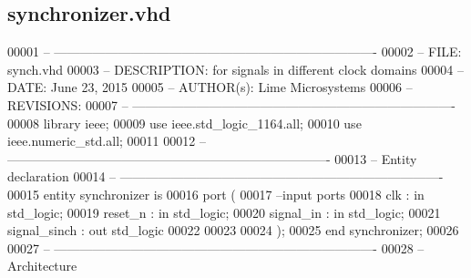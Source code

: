 \subsection{synchronizer.\+vhd}
\label{synchronizer_8vhd_source}

\begin{DoxyCode}
00001 \textcolor{keyword}{-- ---------------------------------------------------------------------------- }
00002 \textcolor{keyword}{-- FILE:    synch.vhd}
00003 \textcolor{keyword}{-- DESCRIPTION: for signals in different clock domains}
00004 \textcolor{keyword}{-- DATE:    June 23, 2015}
00005 \textcolor{keyword}{-- AUTHOR(s):   Lime Microsystems}
00006 \textcolor{keyword}{-- REVISIONS:}
00007 \textcolor{keyword}{-- ---------------------------------------------------------------------------- }
00008 \textcolor{vhdlkeyword}{library }\textcolor{keywordflow}{ieee};
00009 \textcolor{vhdlkeyword}{use }ieee.std\_logic\_1164.\textcolor{keywordflow}{all};
00010 \textcolor{vhdlkeyword}{use }ieee.numeric\_std.\textcolor{keywordflow}{all};
00011 
00012 \textcolor{keyword}{-- ----------------------------------------------------------------------------}
00013 \textcolor{keyword}{-- Entity declaration}
00014 \textcolor{keyword}{-- ----------------------------------------------------------------------------}
00015 \textcolor{keywordflow}{entity }synchronizer \textcolor{keywordflow}{is}
00016   \textcolor{keywordflow}{port} \textcolor{vhdlchar}{(}
00017 \textcolor{keyword}{        --input ports }
00018         \textcolor{vhdlchar}{clk}             \textcolor{vhdlchar}{:} \textcolor{keywordflow}{in} \textcolor{comment}{std\_logic};
00019         \textcolor{vhdlchar}{reset_n}         \textcolor{vhdlchar}{:} \textcolor{keywordflow}{in} \textcolor{comment}{std\_logic};
00020           \textcolor{keywordflow}{signal}\textcolor{vhdlchar}{\_in}         \textcolor{vhdlchar}{:} \textcolor{keywordflow}{in} \textcolor{comment}{std\_logic};
00021           \textcolor{keywordflow}{signal}\textcolor{vhdlchar}{\_sinch}      \textcolor{vhdlchar}{:} \textcolor{keywordflow}{out} \textcolor{comment}{std\_logic}
00022 
00023         
00024         \textcolor{vhdlchar}{)};
00025 \textcolor{keywordflow}{end} \textcolor{vhdlchar}{synchronizer};
00026 
00027 \textcolor{keyword}{-- ----------------------------------------------------------------------------}
00028 \textcolor{keyword}{-- Architecture}

\end{DoxyCode}
